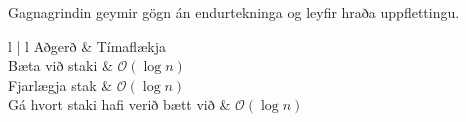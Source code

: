 {
}

{
	\frametitle{}
	{
		\item<1-> Gagnagrindin  geymir gögn án endurtekninga og leyfir hraða uppflettingu.
		\item<2->[]
		{
			{l | l}
			Aðgerð & Tímaflækja\\
			\hline
			Bæta við staki & $\mathcal{O}(\log n)$\\
			Fjarlægja stak & $\mathcal{O}(\log n)$\\
			Gá hvort staki hafi verið bætt við  & $\mathcal{O}(\log n)$\\
		}
	}
}

{
}

{
}


